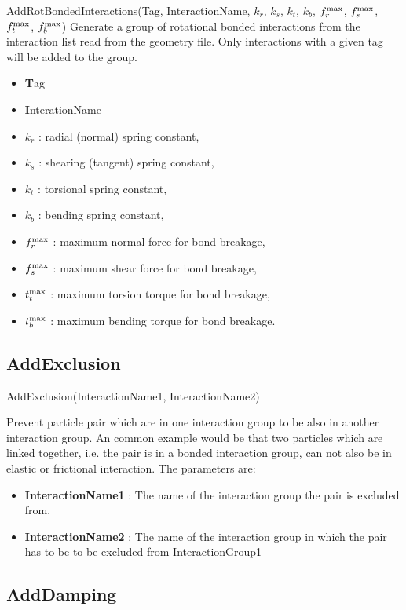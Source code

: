 \documentclass{report}
\begin{document}
\newcommand{\brkForce}[1]{f^{\rm max}_{#1}}
\newcommand{\brkTorque}[1]{t^{\rm max}_{#1}}
\textsf{AddRotBondedInteractions(Tag, InteractionName, $k_r$, $k_s$, $k_t$, $k_b$, $\brkForce{r}$, $\brkForce{s}$, $\brkForce{t}$, $\brkForce{b}$)}
Generate a group of rotational bonded interactions from the interaction
list read from the geometry file. Only interactions with a given tag
will be added to the group.
\begin{itemize}
\item{\textbf Tag}
\item{\textbf InterationName}
\item{$k_r$} : radial (normal) spring constant,
\item{$k_s$} : shearing (tangent) spring constant,
\item{$k_t$} : torsional spring constant,
\item{$k_b$} : bending spring constant,
\item{$\brkForce{r}$} : maximum normal force for bond breakage,
\item{$\brkForce{s}$} : maximum shear force for bond breakage,
\item{$\brkTorque{t}$} : maximum torsion torque for bond breakage,
\item{$\brkTorque{b}$} : maximum bending torque for bond breakage.
\end{itemize}


\subsection{AddExclusion}
\label{sec::AddExclusion}

\textsf{AddExclusion(InteractionName1, InteractionName2)}
\par \medskip
Prevent particle pair which are in one interaction group to be also in another interaction group. An common example would be that two particles which are linked together, i.e. the pair is in a bonded interaction group, can not also be in elastic or frictional interaction.
The parameters are:
\begin{itemize}
\item \textbf{InteractionName1} : The name of the interaction group the pair is excluded from.
\item \textbf{InteractionName2} : The name of the interaction group in which the pair has to be to be excluded from InteractionGroup1
\end{itemize} 

\subsection{AddDamping}
\end{document}
